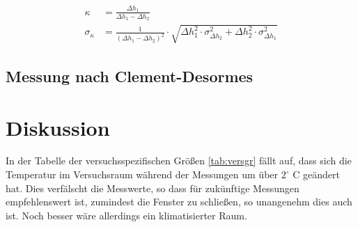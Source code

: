 \documentclass[12pt,a4paper,titlepage,headinclude,bibtotoc]{scrartcl}
\begin{document}
\begin{align*}
	\kappa&=\frac{\Delta h_{1}}{\Delta h_{1} - \Delta h_{2}}\\
	\sigma_{\kappa}&=\frac{1}{\left(\Delta h_{1} - \Delta h_{2}\right)^{2}} \cdot \sqrt{\Delta h_{1}^{2} \cdot \sigma_{\Delta h_2}^{2} + \Delta h_{2}^{2} \cdot \sigma_{\Delta h_1}^{2}}
\end{align*}

\subsection{Messung nach Clement-Desormes}





\section{Diskussion}
\label{sec:diskussion}
In der Tabelle der versuchsspezifischen Größen \ref{tab:versgr} fällt auf, dass sich die Temperatur im Versuchsraum während der Messungen um über $2^\circ$ C geändert hat.
Dies verfälscht die Messwerte, so dass für zukünftige Messungen empfehlenswert ist, zumindest die Fenster zu schließen, so unangenehm dies auch ist.
Noch besser wäre allerdings ein klimatisierter Raum.




\end{document}
